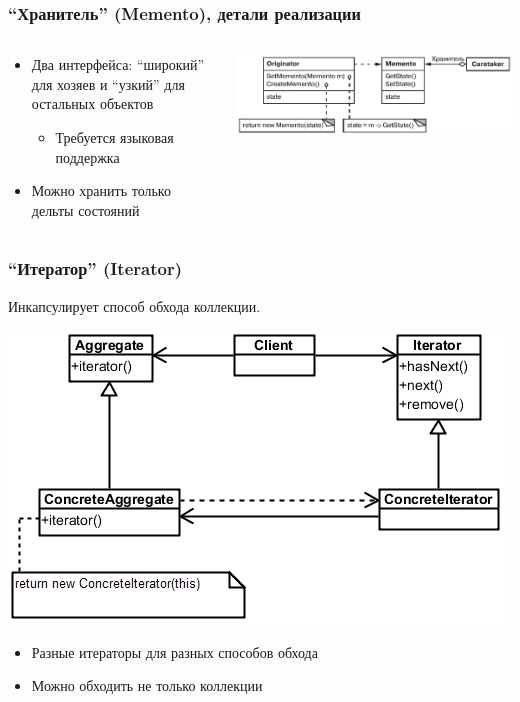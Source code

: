 \documentclass[xetex,mathserif,serif]{beamer}
\begin{document}
	\begin{frame}
		\frametitle{``Хранитель'' (Memento), детали реализации}
		\begin{columns}
			\begin{column}{0.5\textwidth}
				\begin{itemize}
					\item Два интерфейса: ``широкий'' для хозяев и ``узкий'' для остальных объектов
					\begin{itemize}
						\item Требуется языковая поддержка
					\end{itemize}
					\item Можно хранить только дельты состояний
				\end{itemize}
			\end{column}
			\begin{column}{0.5\textwidth}
				\begin{center}
					\includegraphics[width=\textwidth]{memento.png}
				\end{center}
			\end{column}
		\end{columns}
	\end{frame}


	\begin{frame}
		\frametitle{``Итератор'' (Iterator)}
		Инкапсулирует способ обхода коллекции.
		\begin{center}
			\includegraphics[width=\textwidth]{iterator.png}
		\end{center}
		\begin{itemize}
			\item Разные итераторы для разных способов обхода
			\item Можно обходить не только коллекции
		\end{itemize}
	\end{frame}
\end{document}
